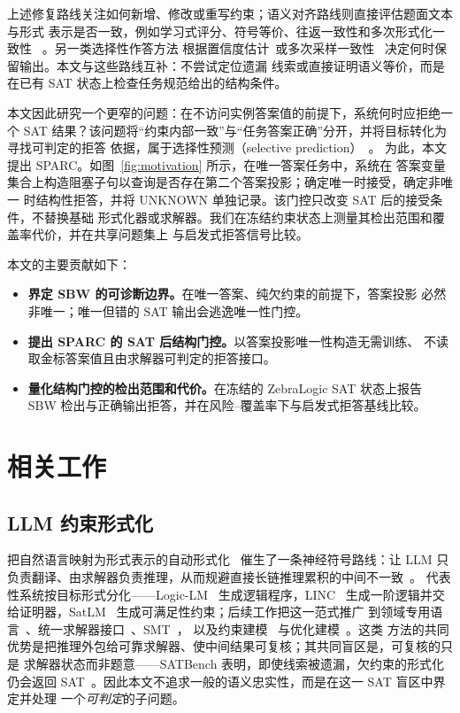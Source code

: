 \documentclass[letterpaper]{article}
\newcommand{\method}{SPARC}
\newcommand{\sbw}{SBW}
\begin{document}
上述修复路线关注如何新增、修改或重写约束；语义对齐路线则直接评估题面文本与形式
表示是否一致，例如学习式评分、符号等价、往返一致性和多次形式化一致性
~\cite{lu2025,li2024symbolic,ryu2025,raza2025,zhou2024dtv}。另一类选择性作答方法
根据置信度估计~\cite{xiong2024,zhang2024rtuning}或多次采样一致性
~\cite{wang2023,manakul2023}决定何时保留输出。本文与这些路线互补：不尝试定位遗漏
线索或直接证明语义等价，而是在已有 SAT 状态上检查任务规范给出的结构条件。

本文因此研究一个更窄的问题：在不访问实例答案值的前提下，系统何时应拒绝一个 SAT
结果？该问题将“约束内部一致”与“任务答案正确”分开，并将目标转化为寻找可判定的拒答
依据，属于选择性预测（selective prediction）~\cite{chow1957,geifman2017,kamath2020}。
为此，本文提出 \method{}。如图~\ref{fig:motivation} 所示，在唯一答案任务中，系统在
答案变量集合上构造阻塞子句以查询是否存在第二个答案投影；确定唯一时接受，确定非唯一
时结构性拒答，并将 UNKNOWN 单独记录。该门控只改变 SAT 后的接受条件，不替换基础
形式化器或求解器。我们在冻结约束状态上测量其检出范围和覆盖率代价，并在共享问题集上
与启发式拒答信号比较。

本文的主要贡献如下：
\begin{itemize}
  \item \textbf{界定 \sbw{} 的可诊断边界。}在唯一答案、纯欠约束的前提下，答案投影
        必然非唯一；唯一但错的 SAT 输出会逃逸唯一性门控。
  \item \textbf{提出 \method{} 的 SAT 后结构门控。}以答案投影唯一性构造无需训练、
        不读取金标答案值且由求解器可判定的拒答接口。
  \item \textbf{量化结构门控的检出范围和代价。}在冻结的 ZebraLogic SAT 状态上报告
        \sbw{} 检出与正确输出拒答，并在风险--覆盖率下与启发式拒答基线比较。
\end{itemize}

\section{相关工作}
\label{sec:related}

\subsection{LLM 约束形式化}
把自然语言映射为形式表示的自动形式化~\cite{wu2022} 催生了一条神经符号路线：让 LLM
只负责翻译、由求解器负责推理，从而规避直接长链推理累积的中间不一致~\cite{lin2025,tyagi2024}。
代表性系统按目标形式分化——Logic-LM~\cite{pan2023} 生成逻辑程序，LINC~\cite{olausson2023}
生成一阶逻辑并交给证明器，SatLM~\cite{ye2023} 生成可满足性约束；后续工作把这一范式推广
到领域专用语言~\cite{kesseli2025}、统一求解器接口~\cite{callewaert2025}、SMT~\cite{oh2026}，
以及约束建模~\cite{tsouros2023,michailidis2024} 与优化建模~\cite{ahmaditeshnizi2024}。这类
方法的共同优势是把推理外包给可靠求解器、使中间结果可复核；其共同盲区是，可复核的只是
求解器状态而非题意——SATBench 表明，即使线索被遗漏，欠约束的形式化仍会返回
SAT~\cite{wei2025}。因此本文不追求一般的语义忠实性，而是在这一 SAT 盲区中界定并处理
一个\emph{可判定}的子问题。
\end{document}
